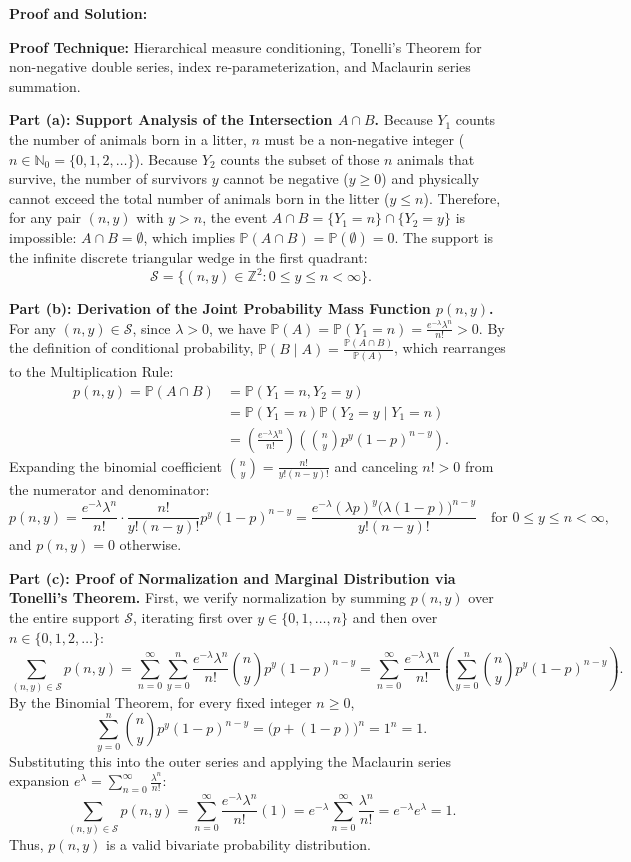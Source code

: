 \documentclass[11pt, letterpaper]{article}
\theoremstyle{definition}
\theoremstyle{remark}
\newcommand{\N}{\mathbb{N}}
\newcommand{\Z}{\mathbb{Z}}
\newcommand{\Prob}{\mathbb{P}}
\begin{document}
\textbf{Proof and Solution:}

\textbf{Proof Technique:} Hierarchical measure conditioning, Tonelli's Theorem for non-negative double series, index re-parameterization, and Maclaurin series summation.

\textbf{Part (a): Support Analysis of the Intersection $A \cap B$.}
Because $Y_1$ counts the number of animals born in a litter, $n$ must be a non-negative integer ($n \in \N_0 = \{0, 1, 2, \dots\}$). Because $Y_2$ counts the subset of those $n$ animals that survive, the number of survivors $y$ cannot be negative ($y \ge 0$) and physically cannot exceed the total number of animals born in the litter ($y \le n$). Therefore, for any pair $(n, y)$ with $y > n$, the event $A \cap B = \{Y_1 = n\} \cap \{Y_2 = y\}$ is impossible: $A \cap B = \emptyset$, which implies $\Prob(A \cap B) = \Prob(\emptyset) = 0$. The support is the infinite discrete triangular wedge in the first quadrant:
\[
\mathcal{S} = \bigl\{(n, y) \in \Z^2 : 0 \le y \le n < \infty\bigr\}.
\]

\textbf{Part (b): Derivation of the Joint Probability Mass Function $p(n, y)$.}
For any $(n, y) \in \mathcal{S}$, since $\lambda > 0$, we have $\Prob(A) = \Prob(Y_1 = n) = \frac{e^{-\lambda}\lambda^n}{n!} > 0$. By the definition of conditional probability, $\Prob(B \mid A) = \frac{\Prob(A \cap B)}{\Prob(A)}$, which rearranges to the Multiplication Rule:
\begin{align*}
p(n, y) = \Prob(A \cap B) &= \Prob(Y_1 = n, Y_2 = y) \\
&= \Prob(Y_1 = n) \Prob(Y_2 = y \mid Y_1 = n) \\
&= \left(\frac{e^{-\lambda}\lambda^n}{n!}\right) \left(\binom{n}{y} p^y (1-p)^{n-y}\right).
\end{align*}
Expanding the binomial coefficient $\binom{n}{y} = \frac{n!}{y!(n-y)!}$ and canceling $n! > 0$ from the numerator and denominator:
\[
p(n, y) = \frac{e^{-\lambda}\lambda^n}{n!} \cdot \frac{n!}{y!(n-y)!} p^y (1-p)^{n-y} = \frac{e^{-\lambda} (\lambda p)^y \bigl(\lambda(1-p)\bigr)^{n-y}}{y!(n-y)!} \quad \text{for } 0 \le y \le n < \infty,
\]
and $p(n, y) = 0$ otherwise.

\textbf{Part (c): Proof of Normalization and Marginal Distribution via Tonelli's Theorem.}
First, we verify normalization by summing $p(n, y)$ over the entire support $\mathcal{S}$, iterating first over $y \in \{0, 1, \dots, n\}$ and then over $n \in \{0, 1, 2, \dots\}$:
\[
\sum_{(n, y) \in \mathcal{S}} p(n, y) = \sum_{n=0}^{\infty} \sum_{y=0}^{n} \frac{e^{-\lambda}\lambda^n}{n!} \binom{n}{y} p^y (1-p)^{n-y} = \sum_{n=0}^{\infty} \frac{e^{-\lambda}\lambda^n}{n!} \left(\sum_{y=0}^{n} \binom{n}{y} p^y (1-p)^{n-y}\right).
\]
By the Binomial Theorem, for every fixed integer $n \ge 0$,
\[
\sum_{y=0}^{n} \binom{n}{y} p^y (1-p)^{n-y} = \bigl(p + (1-p)\bigr)^n = 1^n = 1.
\]
Substituting this into the outer series and applying the Maclaurin series expansion $e^{\lambda} = \sum_{n=0}^{\infty} \frac{\lambda^n}{n!}$:
\[
\sum_{(n, y) \in \mathcal{S}} p(n, y) = \sum_{n=0}^{\infty} \frac{e^{-\lambda}\lambda^n}{n!} (1) = e^{-\lambda} \sum_{n=0}^{\infty} \frac{\lambda^n}{n!} = e^{-\lambda} e^{\lambda} = 1.
\]
Thus, $p(n, y)$ is a valid bivariate probability distribution.
\end{document}
